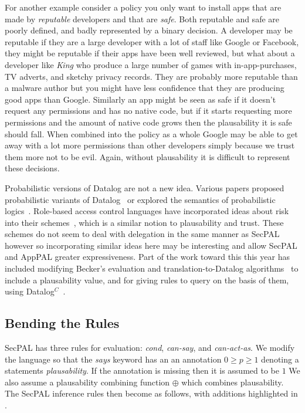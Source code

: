 \documentclass[thesis.tex]{subfiles}
\begin{document}
For another example consider a policy you only want to install apps
that are made by \emph{reputable} developers and that are \emph{safe}.
Both reputable and safe are poorly defined, and badly represented by a
binary decision.  A developer may be reputable if they are a large
developer with a lot of staff like Google or Facebook, they might be
reputable if their apps have been well reviewed, but what about a
developer like \emph{King} who produce a large number of games with
in-app-purchases, TV adverts, and sketchy privacy records.  They are
probably more reputable than a malware author but you might have less
confidence that they are producing good apps than Google.  Similarly
an app might be seen as safe if it doesn't request any permissions and
has no native code, but if it starts requesting more permissions and
the amount of native code grows then the plausability it is safe
should fall.  When combined into the policy as a whole Google may be
able to get away with a lot more permissions than other developers
simply because we trust them more not to be evil.  Again, without
plausability it is difficult to represent these decisions.

Probabilistic versions of Datalog are not a new idea.  Various papers proposed
probabilistic variants of Datalog~\cite{fuhr_probabilistic_1995} or explored the
semantics of probabilistic logics~\cite{halpern_analysis_1990}.  Role-based
access control languages have incorporated ideas about risk into their
schemes~\cite{josang_analysing_2004,dimmock_using_2004,salim_approach_2011},
which is a similar notion to plausability and trust.  These schemes do not seem
to deal with delegation in the same manner as SecPAL however so incorporating
similar ideas here may be interesting and allow SecPAL and AppPAL greater
expressiveness.  Part of the work toward this this year has included modifying Becker's
evaluation and translation-to-Datalog algorithms~\cite{becker_secpal:_2010} to
include a plausability value, and for giving rules to query on the basis of
them, using Datalog$^C$~\cite{li_datalog_2003}.

\subsection{Bending the Rules}

SecPAL has three rules for evaluation: \emph{cond}, \emph{can-say},
and \emph{can-act-as}.  We modify the language so that the \emph{says}
keyword has an an annotation $0 \geq p \geq 1$ denoting a statements
\emph{plausability}.  If the annotation is missing then it is assumed
to be $1$ We also assume a plausability combining function $\oplus$
which combines plausability.  The SecPAL inference rules then become
as follows, with additions highlighted in .
\end{document}
